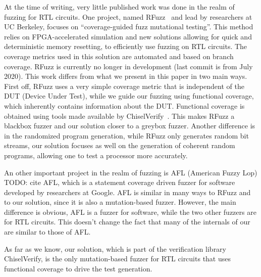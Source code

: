 \documentclass[conference]{IEEEtran}
\newcommand{\todo}[1]{{\color{olive} TODO: #1}}
\newcommand{\rewrite}[1]{{\color{red} rewrite: #1}}
\begin{document}
At the time of writing, very little published work was done in the realm of fuzzing for RTL circuits.
One project, named RFuzz~\cite{rfuzz2018} and lead by researchers at UC Berkeley, focuses on ``coverage-guided fuzz mutational testing''. This method relies on FPGA-accelerated simulation and new solutions allowing for quick and deterministic memory resetting, to efficiently use fuzzing on RTL circuits. The coverage metrics used in this solution are automated and based on branch coverage. RFuzz is currently no longer in development (last commit is from July 2020). This work differs from what we present in this paper in two main ways. First off, RFuzz uses a very simple coverage metric that is independent of the DUT (Device Under Test), while we guide our fuzzing using functional coverage, which inherently contains information about the DUT. Functional coverage is obtained using tools made available by ChiselVerify~\cite{verify:chisel:2020, dobis2021opensource}. This makes RFuzz a blackbox fuzzer and our solution closer to a greybox fuzzer. Another difference is in the randomized program generation, while RFuzz only generates random bit streams, our solution focuses as well on the generation of coherent random programs, allowing one to test a processor more accurately. 

An other important project in the realm of fuzzing is AFL (American Fuzzy Lop)\todo{cite AFL}, which is a statement coverage driven fuzzer for software developed by researchers at Google. AFL is similar in many ways to RFuzz and to our solution, since it is also a mutation-based fuzzer. However, the main difference is obvious, AFL is a fuzzer for software, while the two other fuzzers are for RTL circuits. This doesn't change the fact that many of the internals of our are similar to those of AFL.

As far as we know, our solution, which is part of the verification library ChiselVerify, is the only mutation-based fuzzer for RTL circuits that uses functional coverage to drive the test generation.

\end{document}

